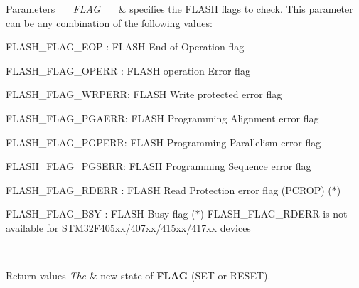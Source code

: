 \begin{DoxyParams}{Parameters}
{\em \+\_\+\+\_\+\+F\+L\+A\+G\+\_\+\+\_\+} & specifies the F\+L\+A\+SH flags to check. This parameter can be any combination of the following values\+: \begin{DoxyItemize}
\item F\+L\+A\+S\+H\+\_\+\+F\+L\+A\+G\+\_\+\+E\+OP \+: F\+L\+A\+SH End of Operation flag \item F\+L\+A\+S\+H\+\_\+\+F\+L\+A\+G\+\_\+\+O\+P\+E\+RR \+: F\+L\+A\+SH operation Error flag \item F\+L\+A\+S\+H\+\_\+\+F\+L\+A\+G\+\_\+\+W\+R\+P\+E\+RR\+: F\+L\+A\+SH Write protected error flag \item F\+L\+A\+S\+H\+\_\+\+F\+L\+A\+G\+\_\+\+P\+G\+A\+E\+RR\+: F\+L\+A\+SH Programming Alignment error flag \item F\+L\+A\+S\+H\+\_\+\+F\+L\+A\+G\+\_\+\+P\+G\+P\+E\+RR\+: F\+L\+A\+SH Programming Parallelism error flag \item F\+L\+A\+S\+H\+\_\+\+F\+L\+A\+G\+\_\+\+P\+G\+S\+E\+RR\+: F\+L\+A\+SH Programming Sequence error flag \item F\+L\+A\+S\+H\+\_\+\+F\+L\+A\+G\+\_\+\+R\+D\+E\+RR \+: F\+L\+A\+SH Read Protection error flag (P\+C\+R\+OP) ($\ast$) \item F\+L\+A\+S\+H\+\_\+\+F\+L\+A\+G\+\_\+\+B\+SY \+: F\+L\+A\+SH Busy flag ($\ast$) F\+L\+A\+S\+H\+\_\+\+F\+L\+A\+G\+\_\+\+R\+D\+E\+RR is not available for S\+T\+M32\+F405xx/407xx/415xx/417xx devices ~\newline
\end{DoxyItemize}
\\
\hline
\end{DoxyParams}

\begin{DoxyRetVals}{Return values}
{\em The} & new state of {\bfseries F\+L\+AG} (S\+ET or R\+E\+S\+ET). \\
\hline
\end{DoxyRetVals}
\mbox{\label{group___f_l_a_s_h___exported___macros_gaa537e44d74ce35ff5bfef80edf03f895}} 
